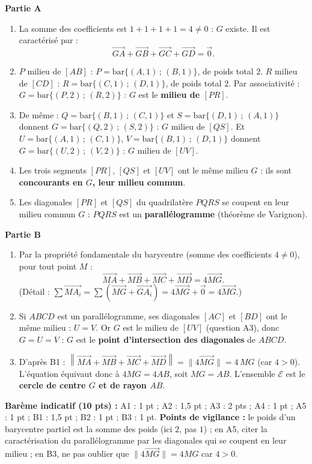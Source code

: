 \documentclass[11pt]{article}
\begin{document}
\begin{corrige}
\textbf{Partie A}
\begin{enumerate}
\item La somme des coefficients est $1+1+1+1=4\neq 0$ : $G$ existe. Il est caractérisé par :
\[ \overrightarrow{GA}+\overrightarrow{GB}+\overrightarrow{GC}+\overrightarrow{GD}=\vec{0}. \]
\item $P$ milieu de $[AB]$ : $P=\mathrm{bar}\{(A,1)\,;\,(B,1)\}$, de poids total $2$. $R$ milieu de $[CD]$ : $R=\mathrm{bar}\{(C,1)\,;\,(D,1)\}$, de poids total $2$. Par associativité : $G=\mathrm{bar}\{(P,2)\,;\,(R,2)\}$ : $G$ est le \textbf{milieu de $[PR]$}.
\item De même : $Q=\mathrm{bar}\{(B,1)\,;\,(C,1)\}$ et $S=\mathrm{bar}\{(D,1)\,;\,(A,1)\}$ donnent $G=\mathrm{bar}\{(Q,2)\,;\,(S,2)\}$ : $G$ milieu de $[QS]$. Et $U=\mathrm{bar}\{(A,1)\,;\,(C,1)\}$, $V=\mathrm{bar}\{(B,1)\,;\,(D,1)\}$ donnent $G=\mathrm{bar}\{(U,2)\,;\,(V,2)\}$ : $G$ milieu de $[UV]$.
\item Les trois segments $[PR]$, $[QS]$ et $[UV]$ ont le même milieu $G$ : ils sont \textbf{concourants en $G$, leur milieu commun}.
\item Les diagonales $[PR]$ et $[QS]$ du quadrilatère $PQRS$ se coupent en leur milieu commun $G$ : $PQRS$ est un \textbf{parallélogramme} (théorème de Varignon).
\end{enumerate}
\textbf{Partie B}
\begin{enumerate}
\item Par la propriété fondamentale du barycentre (somme des coefficients $4\neq 0$), pour tout point $M$ :
\[ \overrightarrow{MA}+\overrightarrow{MB}+\overrightarrow{MC}+\overrightarrow{MD}=4\overrightarrow{MG}. \]
(Détail : $\sum\overrightarrow{MA_i}=\sum(\overrightarrow{MG}+\overrightarrow{GA_i})=4\overrightarrow{MG}+\vec{0}=4\overrightarrow{MG}$.)
\item Si $ABCD$ est un parallélogramme, ses diagonales $[AC]$ et $[BD]$ ont le même milieu : $U=V$. Or $G$ est le milieu de $[UV]$ (question A3), donc $G=U=V$ : $G$ est le \textbf{point d'intersection des diagonales} de $ABCD$.
\item D'après B1 : $\left\|\overrightarrow{MA}+\overrightarrow{MB}+\overrightarrow{MC}+\overrightarrow{MD}\right\|=\|4\overrightarrow{MG}\|=4\,MG$ (car $4>0$). L'équation équivaut donc à $4MG=4AB$, soit $MG=AB$. L'ensemble $\mathcal{E}$ est le \textbf{cercle de centre $G$ et de rayon $AB$}.
\end{enumerate}
\textbf{Barème indicatif (10 pts) :} A1 : 1 pt ; A2 : 1,5 pt ; A3 : 2 pts ; A4 : 1 pt ; A5 : 1 pt ; B1 : 1,5 pt ; B2 : 1 pt ; B3 : 1 pt.
\textbf{Points de vigilance :} le poids d'un barycentre partiel est la somme des poids (ici $2$, pas $1$) ; en A5, citer la caractérisation du parallélogramme par les diagonales qui se coupent en leur milieu ; en B3, ne pas oublier que $\|4\overrightarrow{MG}\|=4MG$ car $4>0$.
\end{corrige}
\end{document}
